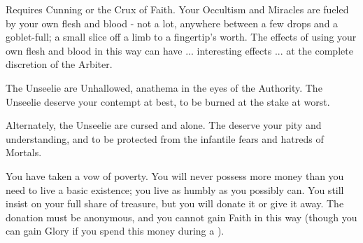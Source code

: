 
  Requires Cunning or the Crux of Faith.  Your Occultism and Miracles are fueled by your own flesh and blood - not a lot, anywhere between a few drops and a goblet-full; a small slice off a limb to a fingertip's worth.  The effects of using your own flesh and blood in this way can have ... interesting effects ... at the complete discretion of the Arbiter.


  The Unseelie are Unhallowed, anathema in the eyes of the Authority.  The Unseelie deserve your contempt at best, to be burned at the stake at worst.

  Alternately, the Unseelie are cursed and alone.  The deserve your pity and understanding, and to be protected from the infantile fears and hatreds of Mortals.


  You have taken a vow of poverty.  You will never possess more money than you need to live a basic existence; you live as humbly as you possibly can.  You still insist on your full share of treasure, but you will donate it or give it away.  The donation must be anonymous, and you cannot gain Faith in this way (though you can gain Glory if you spend this money during a ).

  \cbreak



  











